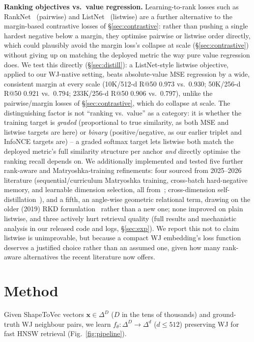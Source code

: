 \documentclass[sigconf]{acmart}
\begin{document}
\textbf{Ranking objectives vs.\ value regression.} Learning-to-rank losses such as
RankNet~\cite{burges05} (pairwise) and ListNet~\cite{cao07} (listwise) are a
further alternative to the margin-based contrastive losses of
\S\ref{sec:contrastive}: rather than pushing a single hardest negative below a
margin, they optimise pairwise or listwise order directly, which could plausibly
avoid the margin loss's collapse at scale (\S\ref{sec:contrastive}) without giving
up on matching the deployed metric the way pure value regression does. We test
this directly (\S\ref{sec:distill}): a ListNet-style listwise objective, applied to
our WJ-native setting, beats absolute-value MSE regression by a wide, consistent
margin at every scale (10K/512-d R@50 $0.973$ vs.\ $0.930$; 50K/256-d R@50 $0.921$
vs.\ $0.794$; 233K/256-d R@50 $0.906$ vs.\ $0.797$), unlike the pairwise/margin
losses of \S\ref{sec:contrastive}, which do collapse at scale. The distinguishing
factor is not ``ranking vs.\ value'' as a category: it is whether the training
target is \emph{graded} (proportional to true similarity, as both MSE and listwise
targets are here) or \emph{binary} (positive/negative, as our earlier triplet and
InfoNCE targets are) -- a graded softmax target lets listwise both match the
deployed metric's full similarity structure per anchor \emph{and} directly optimise
the ranking recall depends on. We additionally implemented and tested five further
rank-aware and Matryoshka-training refinements: four sourced from 2025--2026
literature (sequential/curriculum Matryoshka training, cross-batch hard-negative
memory, and learnable dimension selection, all from~\cite{smec25}; cross-dimension
self-distillation~\cite{mipic26}), and a fifth, an angle-wise geometric relational
term, drawing on the older (2019) RKD formulation~\cite{park19rkd} rather than a new
one; none improved on plain listwise, and three actively hurt retrieval quality (full
results and mechanistic analysis in
our released code and logs, \S\ref{sec:exp}). We report this not to claim
listwise is unimprovable, but because a compact WJ embedding's loss function
deserves a justified choice rather than an assumed one, given how many rank-aware
alternatives the recent literature now offers.

\section{Method}
Given ShapeToVec vectors $\mathbf{x}\in\Delta^{D}$ ($D$ in the tens of thousands) and ground-truth
WJ neighbour pairs, we learn $f_\theta:\Delta^{D}\!\to\!\Delta^{d}$ ($d\le512$)
preserving WJ for fast HNSW retrieval (Fig.~\ref{fig:pipeline}).
\end{document}
